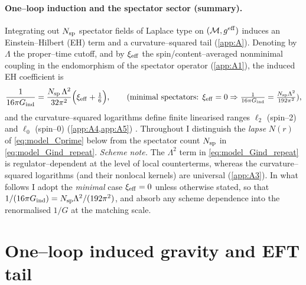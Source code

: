 \documentclass{iopjournal}
\begin{document}
\paragraph{One–loop induction and the spectator sector (summary).}
Integrating out $N_{\rm sp}$ spectator fields of Laplace type on $(\mathcal M,g^{\rm eff})$ induces an Einstein–Hilbert (EH) term and a curvature–squared tail (\cref{app:A}). Denoting by $\Lambda$ the proper–time cutoff, and by $\xi_{\rm eff}$ the spin/content–averaged nonminimal coupling in the endomorphism of the spectator operator (\cref{app:A1}), the induced EH coefficient is
\begin{equation}
\frac{1}{16\pi G_{\rm ind}}=\frac{N_{\rm sp}\,\Lambda^2}{32\pi^2}\Big(\xi_{\rm eff}+\tfrac{1}{6}\Big),
\qquad
\text{(minimal spectators: }\xi_{\rm eff}=0\Rightarrow \tfrac{1}{16\pi G_{\rm ind}}=\tfrac{N_{\rm sp}\Lambda^2}{192\pi^2}\text{)},
\label{eq:model_Gind_repeat}
\end{equation}
and the curvature–squared logarithms define finite linearised ranges $\ell_2$ (spin–2) and $\ell_0$ (spin–0) (\cref{app:A4,app:A5}) \cite{DeWitt1965,ParkerToms,Vassilevich2003,BarvinskyVilkovisky,Donoghue1994}. Throughout I distinguish the \emph{lapse} $N(r)$ of \eqref{eq:model_Cprime} below from the spectator count $N_{\rm sp}$ in \eqref{eq:model_Gind_repeat}.
\noindent\emph{Scheme note.} The $\Lambda^2$ term in \eqref{eq:model_Gind_repeat} is regulator–dependent at the level of local counterterms, whereas the curvature–squared logarithms (and their nonlocal kernels) are universal (\cref{app:A3}). In what follows I adopt the \emph{minimal} case $\xi_{\rm eff}=0$ unless otherwise stated, so that $1/(16\pi G_{\rm ind})=N_{\rm sp}\Lambda^2/(192\pi^2)$, and absorb any scheme dependence into the renormalised $1/G$ at the matching scale.


\section{One–loop induced gravity and EFT tail}\label{sec:induced}
\end{document}
